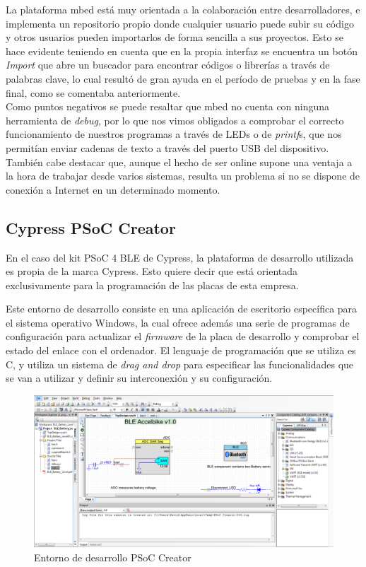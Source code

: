 La plataforma mbed está muy orientada a la colaboración entre desarrolladores, e implementa un repositorio propio donde cualquier usuario puede subir su código y otros usuarios pueden importarlos de forma sencilla a sus proyectos. Esto se hace evidente teniendo en cuenta que en la propia interfaz se encuentra un botón \textit{Import} que abre un buscador para encontrar códigos o librerías a través de palabras clave, lo cual resultó de gran ayuda en el período de pruebas y en la fase final, como se comentaba anteriormente.\\

Como puntos negativos se puede resaltar que mbed no cuenta con ninguna herramienta de \textit{debug}, por lo que nos vimos obligados a comprobar el correcto funcionamiento de nuestros programas a través de LEDs o de \textit{printf}s, que nos permitían enviar cadenas de texto a través del puerto USB del dispositivo. También cabe destacar que, aunque el hecho de ser online supone una ventaja a la hora de trabajar desde varios sistemas, resulta un problema si no se dispone de conexión a Internet en un determinado momento.

\subsection{Cypress PSoC Creator}
\label{explicacionPSoCCreator}

En el caso del kit PSoC 4 BLE de Cypress, la plataforma de desarrollo utilizada es propia de la marca Cypress. Esto quiere decir que está orientada exclusivamente para la programación de las placas de esta empresa.

Este entorno de desarrollo consiste en una aplicación de escritorio específica para el sistema operativo Windows, la cual ofrece además una serie de programas de configuración para actualizar el \textit{firmware} de la placa de desarrollo y comprobar el estado del enlace con el ordenador. El lenguaje de programación que se utiliza es C, y utiliza un sistema de \textit{drag and drop} para especificar las funcionalidades que se van a utilizar y definir su interconexión y su configuración. \\

\begin{figure}[h]%
	\centering 	
    \includegraphics[width=\textwidth]{figures/psoc_compilador.PNG}
   	\caption[Entorno de desarrollo PSoC Creator]{Entorno de desarrollo PSoC Creator}
   	\label{figuraPSoCCreator}
\end{figure}

